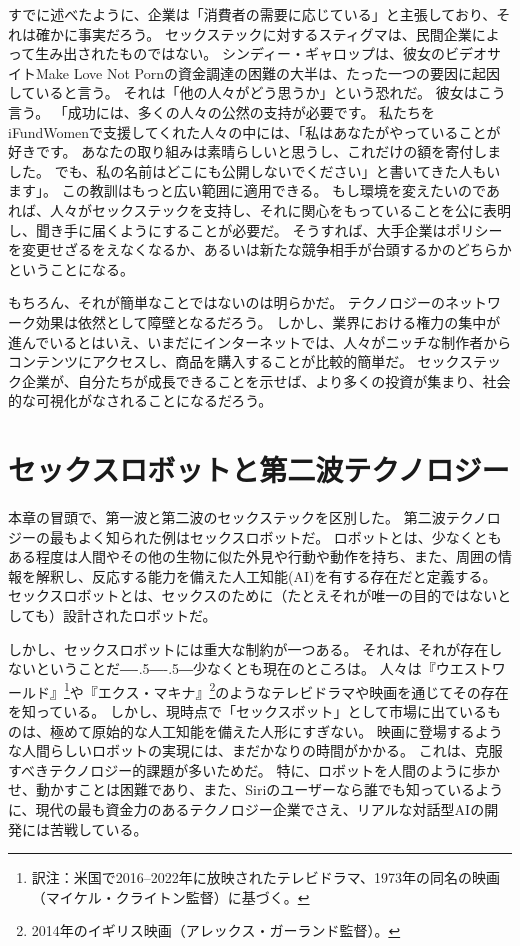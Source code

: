\documentclass[paper=a4,book,openany]{jlreq}
\def\DDASH{―\kern-.5\zw―\kern-.5\zw―}
\begin{document}
すでに述べたように、企業は「消費者の需要に応じている」と主張しており、それは確かに事実だろう。
セックステックに対するスティグマは、民間企業によって生み出されたものではない。
シンディー・ギャロップは、彼女のビデオサイトMake Love Not Pornの資金調達の困難の大半は、たった一つの要因に起因していると言う。
それは「他の人々がどう思うか」という恐れだ。
彼女はこう言う。
「成功には、多くの人々の公然の支持が必要です。
私たちをiFundWomenで支援してくれた人々の中には、「私はあなたがやっていることが好きです。
あなたの取り組みは素晴らしいと思うし、これだけの額を寄付しました。
でも、私の名前はどこにも公開しないでください」と書いてきた人もいます」\citep{manning17:_sextec_revol_will_not_be_crowd}。
この教訓はもっと広い範囲に適用できる。
もし環境を変えたいのであれば、人々がセックステックを支持し、それに関心をもっていることを公に表明し、聞き手に届くようにすることが必要だ。
そうすれば、大手企業はポリシーを変更せざるをえなくなるか、あるいは新たな競争相手が台頭するかのどちらかということになる。

もちろん、それが簡単なことではないのは明らかだ。
テクノロジーのネットワーク効果は依然として障壁となるだろう。
しかし、業界における権力の集中が進んでいるとはいえ、いまだにインターネットでは、人々がニッチな制作者からコンテンツにアクセスし、商品を購入することが比較的簡単だ。
セックステック企業が、自分たちが成長できることを示せば、より多くの投資が集まり、社会的な可視化がなされることになるだろう。

\section{セックスロボットと第二波テクノロジー}

本章の冒頭で、第一波と第二波のセックステックを区別した。
第二波テクノロジーの最もよく知られた例はセックスロボットだ。
ロボットとは、少なくともある程度は人間やその他の生物に似た外見や行動や動作を持ち、また、周囲の情報を解釈し、反応する能力を備えた人工知能(AI)を有する存在だと定義する\citep{danaher17:_shoul_we_be_think_sex_robot}。
セックスロボットとは、セックスのために（たとえそれが唯一の目的ではないとしても）設計されたロボットだ。

しかし、セックスロボットには重大な制約が一つある。
それは、それが存在しないということだ{\DDASH}少なくとも現在のところは。
人々は『ウエストワールド』\footnote{訳注：米国で2016--2022年に放映されたテレビドラマ、1973年の同名の映画（マイケル・クライトン監督）に基づく。}や『エクス・マキナ』\footnote{2014年のイギリス映画（アレックス・ガーランド監督）。}のようなテレビドラマや映画を通じてその存在を知っている。
しかし、現時点で「セックスボット」として市場に出ているものは、極めて原始的な人工知能を備えた人形にすぎない。
映画に登場するような人間らしいロボットの実現には、まだかなりの時間がかかる。
これは、克服すべきテクノロジー的課題が多いためだ。
特に、ロボットを人間のように歩かせ、動かすことは困難であり、また、Siriのユーザーなら誰でも知っているように、現代の最も資金力のあるテクノロジー企業でさえ、リアルな対話型AIの開発には苦戦している。
\end{document}
